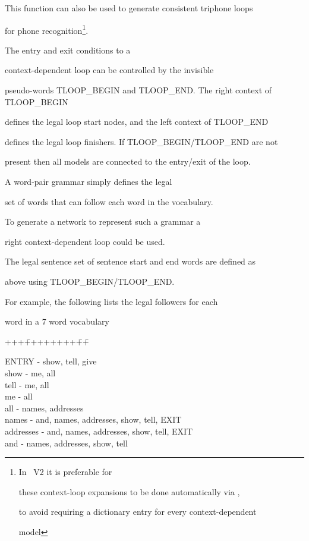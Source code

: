 This function can also be used to generate consistent triphone loops 


for phone recognition\footnote{In \HTK\ V2 it is preferable for


these context-loop expansions to be done automatically via ,


to avoid requiring a dictionary entry for every context-dependent


model}.


The entry and exit conditions to a


context-dependent loop can be controlled by the invisible


pseudo-words TLOOP\_BEGIN and TLOOP\_END.  The right context of TLOOP\_BEGIN


defines the legal loop start nodes, and the left context of TLOOP\_END


defines the legal loop finishers. If TLOOP\_BEGIN/TLOOP\_END are not


present then all models are connected to the entry/exit of the loop.





A word-pair grammar simply defines the legal


set of words that can follow each word in the vocabulary.


To generate a network to represent such a grammar a


right context-dependent loop could be used.


The legal sentence set of sentence start and end words are defined as


above using TLOOP\_BEGIN/TLOOP\_END.





For example, the following lists the legal followers for each


word in a 7 word vocabulary





\begin{tabbing}


+++\=++++++++\=++\= \kill


\> ENTRY \> - \> show, tell, give \\


\> show \> - \> me, all \\


\> tell \> - \> me, all \\


\> me \> - \> all \\


\> all \> - \> names, addresses \\


\> names \> - \> and, names, addresses, show, tell, EXIT \\


\> addresses \> - \> and, names, addresses, show, tell, EXIT \\


\> and \> - \>  names, addresses, show, tell


\end{tabbing}





